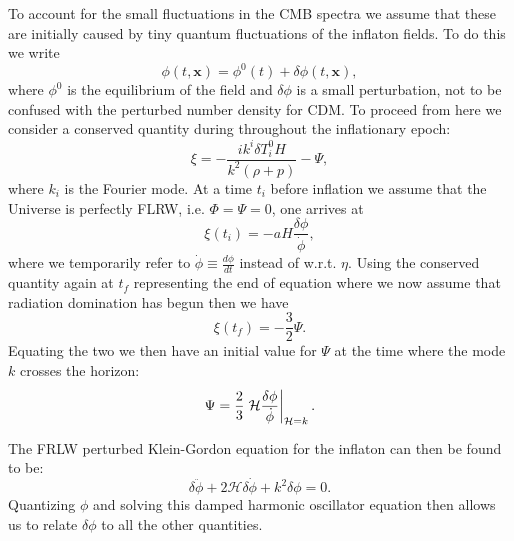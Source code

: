 \documentclass[%
reprint,
 amsmath,amssymb,
 aps,
]{revtex4-2}
\newcommand{\Hp}{\mathcal{H}}
\begin{document}
To account for the small fluctuations in the CMB spectra we assume that these are initially caused by tiny quantum fluctuations of the inflaton fields. To do this we write
\[\phi(t,\textbf{x})=\phi^0(t)+\delta\phi(t,\textbf{x}),\]
where $\phi^0$ is the equilibrium of the field and $\delta\phi$ is a small perturbation, not to be confused with the perturbed number density for CDM. To proceed from here we consider a conserved quantity during throughout the inflationary epoch:
\begin{equation}
	\xi=-\frac{ik^i\delta T_i^0H}{k^2(\rho+p)}-\Psi,
	\label{eq:xi}
\end{equation}
where $k_i$ is the Fourier mode. At a time $t_i$ before inflation we assume that the Universe is perfectly FLRW, i.e. $\Phi=\Psi=0$, one arrives at
\[\xi(t_i)=-aH\frac{\delta\phi}{\dot\phi},\]
where we temporarily refer to $\dot\phi\equiv\frac{d\phi}{dt}$ instead of w.r.t. $\eta$. Using the conserved quantity again at $t_f$ representing the end of equation where we now assume that radiation domination has begun then we have
\[\xi(t_f)=-\frac{3}{2}\Psi.\]
Equating the two we then have an initial value for $\Psi$ at the time where the mode $k$ crosses the horizon:
\begin{equation}
	\Psi=\frac{2}{3}\eval{\Hp\frac{\delta\phi}{\dot\phi}}_{\Hp=k}.
	\label{Psi_infl}
\end{equation}

The FRLW perturbed Klein-Gordon equation for the inflaton can then be found to be:
\[\delta\ddot\phi+2\Hp\delta\dot\phi+k^2\delta\phi=0.\]
Quantizing $\phi$ and solving this damped harmonic oscillator equation then allows us to relate $\delta\phi$ to all the other quantities. 
\end{document}

